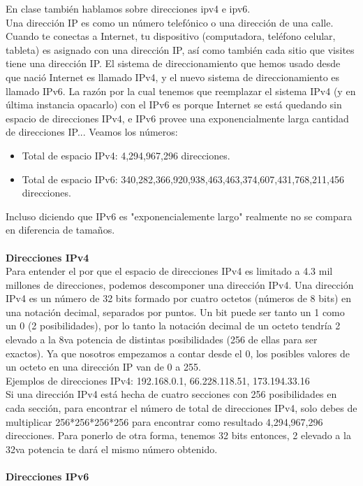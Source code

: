 \documentclass[11pt, a4paper]{report}
\begin{document}
En clase también hablamos sobre direcciones ipv4 e ipv6. \\

Una dirección IP es como un número telefónico o una dirección de una calle.
Cuando te conectas a Internet, tu dispositivo (computadora, teléfono celular,
tableta) es asignado con una dirección IP, así como también cada sitio que
visites tiene una dirección IP. El sistema de direccionamiento que hemos usado
desde que nació Internet es llamado IPv4, y el nuevo sistema de
direccionamiento es llamado IPv6. La razón por la cual tenemos que reemplazar
el sistema IPv4 (y en última instancia opacarlo) con el IPv6 es porque Internet
se está quedando sin espacio de direcciones IPv4, e IPv6 provee una
exponencialmente larga cantidad de direcciones IP... Veamos los números:

\begin{itemize}  
\item Total de espacio IPv4: 4,294,967,296 direcciones.
\item Total de espacio IPv6: 340,282,366,920,938,463,463,374,607,431,768,211,456 direcciones.
\end{itemize}

Incluso diciendo que IPv6 es "exponencialemente largo" realmente no se compara
en diferencia de tamaños. \\
\\
\textbf{Direcciones IPv4} \\

Para entender el por que el espacio de direcciones IPv4 es limitado a 4.3 mil
millones de direcciones, podemos descomponer una dirección IPv4. Una dirección
IPv4 es un número de 32 bits formado por cuatro octetos (números de 8 bits) en
una notación decimal, separados por puntos. Un bit puede ser tanto un 1 como un
0 (2 posibilidades), por lo tanto la notación decimal de un octeto tendría 2
elevado a la 8va potencia de distintas posibilidades (256 de ellas para ser
exactos). Ya que nosotros empezamos a contar desde el 0, los posibles valores
de un octeto en una dirección IP van de 0 a 255. \\

Ejemplos de direcciones IPv4: 192.168.0.1, 66.228.118.51, 173.194.33.16 \\

Si una dirección IPv4 está hecha de cuatro secciones con 256 posibilidades en
cada sección, para encontrar el número de total de direcciones IPv4, solo debes
de multiplicar 256*256*256*256 para encontrar como resultado 4,294,967,296
direcciones. Para ponerlo de otra forma, tenemos 32 bits entonces, 2 elevado a
la 32va potencia te dará el mismo número obtenido. \\
\\
\textbf{Direcciones IPv6} \\
\end{document}

